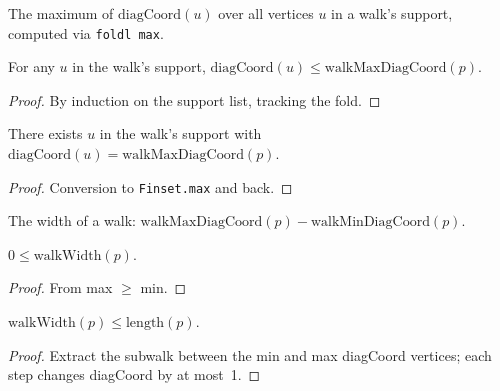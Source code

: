 \begin{lemma}
\begin{definition}\label{def:walk_max_diag}
\leanok
  The maximum of $\mathrm{diagCoord}(u)$ over all vertices $u$ in
  a walk's support, computed via \texttt{foldl max}.
\end{definition}

\begin{lemma}\label{lem:walk_max_ge}
\leanok
{}
  For any $u$ in the walk's support,
  $\mathrm{diagCoord}(u) \leq \mathrm{walkMaxDiagCoord}(p)$.
\end{lemma}
\begin{proof}\leanok By induction on the support list, tracking the fold.\end{proof}

\begin{lemma}\label{lem:walk_max_achieved}
\leanok
{}
  There exists $u$ in the walk's support with
  $\mathrm{diagCoord}(u) = \mathrm{walkMaxDiagCoord}(p)$.
\end{lemma}
\begin{proof}\leanok Conversion to \texttt{Finset.max} and back.\end{proof}

\begin{definition}\label{def:walk_width}
\leanok
{}
  The width of a walk: $\mathrm{walkMaxDiagCoord}(p) - \mathrm{walkMinDiagCoord}(p)$.
\end{definition}

\begin{lemma}\label{lem:width_nonneg}
\leanok
{}
  $0 \leq \mathrm{walkWidth}(p)$.
\end{lemma}
\begin{proof}\leanok From max $\geq$ min.\end{proof}

\begin{lemma}\label{lem:width_le_length}
\leanok
{}
  $\mathrm{walkWidth}(p) \leq \mathrm{length}(p)$.
\end{lemma}
\begin{proof}\leanok
  Extract the subwalk between the min and max diagCoord vertices;
  each step changes diagCoord by at most~1.
\end{proof}


\end{lemma}
